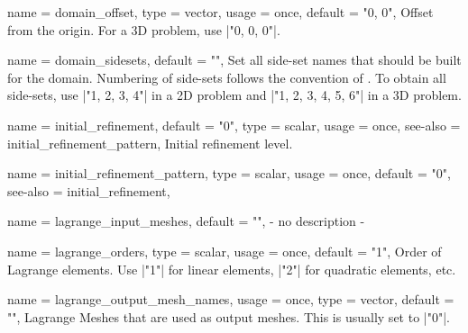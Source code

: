 \begin{parameter}{
    name    = {domain_offset},
    type    = {vector},
    usage   = {once},
    default = {"0, 0"},
}
Offset from the origin.
For a 3D problem, use |"0, 0, 0"|.
\end{parameter}

\begin{parameter}{
    name    = {domain_sidesets},
    default = {""},
}
Set all side-set names that should be built for the domain.
Numbering of side-sets follows the convention of \cite{noauthor_exodus_nodate}.
To obtain all side-sets, use |"1, 2, 3, 4"| in a 2D problem and |"1, 2, 3, 4, 5, 6"| in a 3D problem.
\end{parameter}

\begin{parameter}{
    name    = {initial_refinement},
    default = {"0"},
    type    = {scalar},
    usage   = {once},
    see-also = {initial_refinement_pattern},
}
Initial refinement level.
\end{parameter}

\begin{parameter}{
    name    = {initial_refinement_pattern},
    type    = {scalar},
    usage   = {once},
    default = {"0"},
    see-also = {initial_refinement},
}
\end{parameter}

\begin{parameter}{
    name    = {lagrange_input_meshes},
    default = {""},
}
- no description -
\end{parameter}

\begin{parameter}{
    name    = {lagrange_orders},
    type    = {scalar},
    usage   = {once},
    default = {"1"},
}
Order of Lagrange elements.
Use |"1"| for linear elements, |"2"| for quadratic elements, etc.
\end{parameter}

\begin{parameter}{
    name    = {lagrange_output_mesh_names},
    usage   = {once},
    type    = {vector},
    default = {""},
}
Lagrange Meshes that are used as output meshes.
This is usually set to |"0"|.
\end{parameter}

